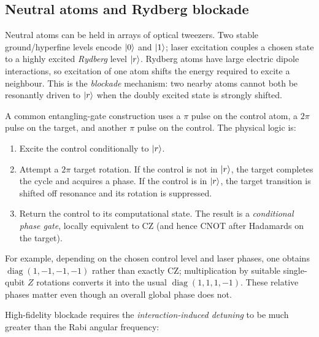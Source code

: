 \subsection{Neutral atoms and Rydberg blockade}
Neutral atoms can be held in arrays of optical tweezers. Two stable ground/hyperfine levels encode $\left\lvert 0\right\rangle$ and $\left\lvert 1\right\rangle$; laser excitation couples a chosen state to a highly excited \emph{Rydberg} level $\left\lvert r\right\rangle$. Rydberg atoms have large electric dipole interactions, so excitation of one atom shifts the energy required to excite a neighbour. This is the \emph{blockade} mechanism: two nearby atoms cannot both be resonantly driven to $\left\lvert r\right\rangle$ when the doubly excited state is strongly shifted.

A common entangling-gate construction uses a $\pi$ pulse on the control atom, a $2\pi$ pulse on the target, and another $\pi$ pulse on the control. The physical logic is:
\begin{enumerate}
\item Excite the control conditionally to $\left\lvert r\right\rangle$.
\item Attempt a $2\pi$ target rotation. If the control is not in $\left\lvert r\right\rangle$, the target completes the cycle and acquires a phase. If the control is in $\left\lvert r\right\rangle$, the target transition is shifted off resonance and its rotation is suppressed.
\item Return the control to its computational state. The result is a \emph{conditional phase gate}, locally equivalent to CZ (and hence CNOT after Hadamards on the target).
\end{enumerate}
For example, depending on the chosen control level and laser phases, one obtains $\operatorname{diag}(1,-1,-1,-1)$ rather than exactly CZ; multiplication by suitable single-qubit $Z$ rotations converts it into the usual $\operatorname{diag}(1,1,1,-1)$. These relative phases matter even though an overall global phase does not.

High-fidelity blockade requires the \emph{interaction-induced detuning} to be much greater than the Rabi angular frequency:

